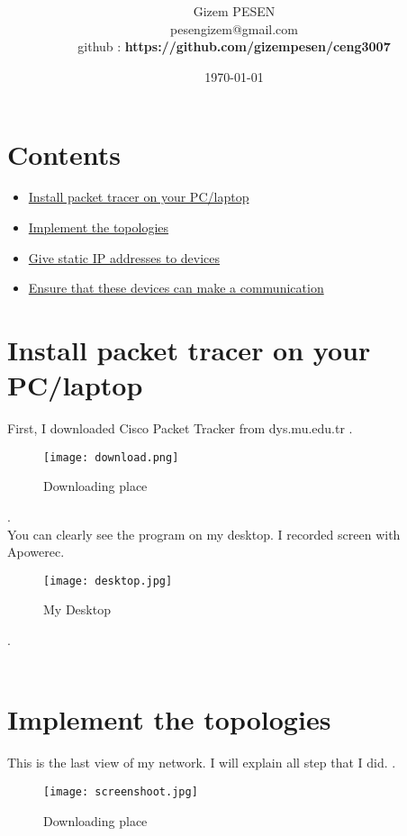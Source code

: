 \documentclass[onecolumn]{article}
\title{\spacecaps{  Ceng 3007 Computer Networks Midterm }\\ \normalsize \spacesc{} }
\author{Gizem PESEN\\pesengizem@gmail.com\\
github : \textbf{https://github.com/gizempesen/ceng3007}}
\date{\today}
\begin{document}
\maketitle








\section{Contents }

\begin{itemize}
\item \hyperref[sec:2]{Install packet tracer on your PC/laptop}
\item \hyperref[sec:2]{Implement the topologies}
\item \hyperref[sec:3]{Give static IP addresses to devices}
\item \hyperref[sec:4]{Ensure that these devices can make a communication }
\end{itemize}

\section{Install packet tracer on your PC/laptop}
\label{sec:2}

First, I downloaded Cisco Packet Tracker from dys.mu.edu.tr 
.\\
\begin{figure}[ht!]
\centering
\texttt{[image: download.png]}
\caption{Downloading place \label{}}
\end{figure}

.\\ You can clearly see the program on my desktop. I recorded screen with Apowerec.
\begin{figure}[ht!]
\centering
\texttt{[image: desktop.jpg]}
\caption{My Desktop  \label{}}
\end{figure}

.\\\\
\section{Implement the topologies}
\label{sec:2}
This is the last view of my network. I will explain all step that I did.
.\\
\begin{figure}[ht!]
\centering
\texttt{[image: screenshoot.jpg]}
\caption{Downloading place \label{}}
\end{figure}
\end{document}
